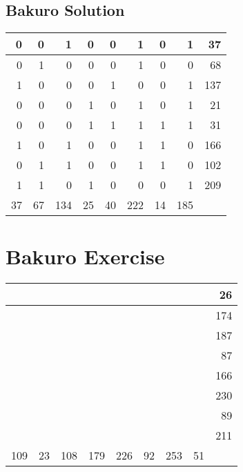 \documentclass[]{article}
\begin{document}
 \subsection{Bakuro Solution} 
\begin{tabular}{rrrrrrrrr}
\hline
  0 &  0 &   1 &  0 &  0 &   1 &  0 &   1 &  37 \\ \hline
  0 &  1 &   0 &  0 &  0 &   1 &  0 &   0 &  68 \\ \hline
  1 &  0 &   0 &  0 &  1 &   0 &  0 &   1 & 137 \\ \hline
  0 &  0 &   0 &  1 &  0 &   1 &  0 &   1 &  21 \\ \hline
  0 &  0 &   0 &  1 &  1 &   1 &  1 &   1 &  31 \\ \hline
  1 &  0 &   1 &  0 &  0 &   1 &  1 &   0 & 166 \\ \hline
  0 &  1 &   1 &  0 &  0 &   1 &  1 &   0 & 102 \\ \hline
  1 &  1 &   0 &  1 &  0 &   0 &  0 &   1 & 209 \\ \hline
 37 & 67 & 134 & 25 & 40 & 222 & 14 & 185 &     \\ \hline
\hline
\end{tabular}\newpage\section{Bakuro Exercise}\begin{tabular}{rrrrrrrrr}
\hline
     &    &     &     &     &    &     &    &  26 \\ \hline
     &    &     &     &     &    &     &    & 174 \\ \hline
     &    &     &     &     &    &     &    & 187 \\ \hline
     &    &     &     &     &    &     &    &  87 \\ \hline
     &    &     &     &     &    &     &    & 166 \\ \hline
     &    &     &     &     &    &     &    & 230 \\ \hline
     &    &     &     &     &    &     &    &  89 \\ \hline
     &    &     &     &     &    &     &    & 211 \\ \hline
 109 & 23 & 108 & 179 & 226 & 92 & 253 & 51 &     \\ \hline
\hline
\end{tabular}\newpage 
\end{document}

